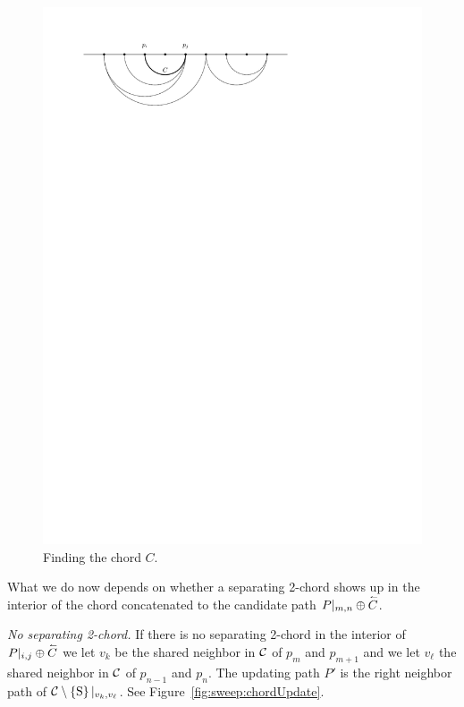     \begin{figure}[t]
      \centering
      \includegraphics[scale=1]{unifiedalgo/img/sweep/chordsOnCandidatePath}
      \caption{Finding the chord $C$.}
      \label{fig:sweep:chordsOnCandidatePath}
    \end{figure}

    What we do now depends on whether a separating 2-chord shows up in the interior of the chord concatenated to the candidate path $P|_{m, n} \oplus \accentset{\leftharpoonup}{{C}}$.

    \emph{No separating 2-chord.}
      If there is no separating 2-chord in the interior of $P|_{i, j} \oplus \accentset{\leftharpoonup}{{C}}$ we let $v_k$ be the shared neighbor in $\mathcal{C}$ of $p_{m}$ and $p_{m +1}$ and we let $v_\ell$ the shared neighbor in $\mathcal{C}$ of $p_{n -1}$ and $p_{n}$.
      The updating path $P'$ is the right neighbor path of $\mathcal{C} \setminus \left\lbrace {\mathrm{S}} \right\rbrace|_{v_k, v_\ell}$.
      See Figure~\ref{fig:sweep:chordUpdate}.

